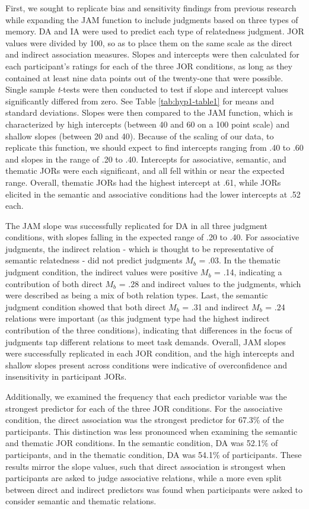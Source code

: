 \documentclass[english,,man]{apa6}
\begin{document}
First, we sought to replicate bias and sensitivity findings from previous research while expanding the JAM function to include judgments based on three types of memory. DA and IA were used to predict each type of relatedness judgment. JOR values were divided by 100, so as to place them on the same scale as the direct and indirect association measures. Slopes and intercepts were then calculated for each participant's ratings for each of the three JOR conditions, as long as they contained at least nine data points out of the twenty-one that were possible. Single sample \emph{t}-tests were then conducted to test if slope and intercept values significantly differed from zero. See Table \ref{tab:hyp1-table1} for means and standard deviations. Slopes were then compared to the JAM function, which is characterized by high intercepts (between 40 and 60 on a 100 point scale) and shallow slopes (between 20 and 40). Because of the scaling of our data, to replicate this function, we should expect to find intercepts ranging from .40 to .60 and slopes in the range of .20 to .40. Intercepts for associative, semantic, and thematic JORs were each significant, and all fell within or near the expected range. Overall, thematic JORs had the highest intercept at .61, while JORs elicited in the semantic and associative conditions had the lower intercepts at .52 each.

The JAM slope was successfully replicated for DA in all three judgment conditions, with slopes falling in the expected range of .20 to .40. For associative judgments, the indirect relation - which is thought to be representative of semantic relatedness - did not predict judgments \(M_b\) = .03. In the thematic judgment condition, the indirect values were positive \(M_b\) = .14, indicating a contribution of both direct \(M_b\) = .28 and indirect values to the judgments, which were described as being a mix of both relation types. Last, the semantic judgment condition showed that both direct \(M_b\) = .31 and indirect \(M_b\) = .24 relations were important (as this judgment type had the highest indirect contribution of the three conditions), indicating that differences in the focus of judgments tap different relations to meet task demands. Overall, JAM slopes were successfully replicated in each JOR condition, and the high intercepts and shallow slopes present across conditions were indicative of overconfidence and insensitivity in participant JORs.

Additionally, we examined the frequency that each predictor variable was the strongest predictor for each of the three JOR conditions. For the associative condition, the direct association was the strongest predictor for 67.3\% of the participants. This distinction was less pronounced when examining the semantic and thematic JOR conditions. In the semantic condition, DA was 52.1\% of participants, and in the thematic condition, DA was 54.1\% of participants. These results mirror the slope values, such that direct association is strongest when participants are asked to judge associative relations, while a more even split between direct and indirect predictors was found when participants were asked to consider semantic and thematic relations.
\end{document}
